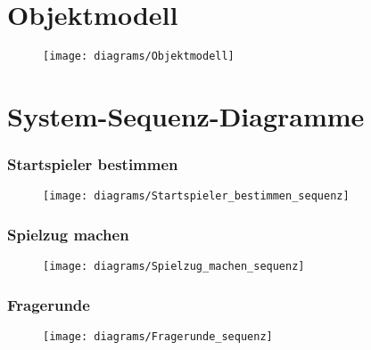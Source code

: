 \newpage
\section{Objektmodell}
\begin{figure}[h]
  \begin{center}
    \texttt{[image: diagrams/Objektmodell]}
  \end{center}
\end{figure}

\newpage
\section{System-Sequenz-Diagramme}
\subsubsection{Startspieler bestimmen}
\begin{figure}[h]
  \begin{center}
    \texttt{[image: diagrams/Startspieler\_bestimmen\_sequenz]}
  \end{center}
\end{figure}

\newpage
\subsubsection{Spielzug machen}
\begin{figure}[h]
  \begin{center}
    \texttt{[image: diagrams/Spielzug\_machen\_sequenz]}
  \end{center}
\end{figure}

\newpage
\subsubsection{Fragerunde}
\begin{figure}[h]
  \begin{center}
    \texttt{[image: diagrams/Fragerunde\_sequenz]}
  \end{center}
\end{figure}
